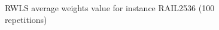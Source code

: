 \begin{figure}[H]
	\centering%
	\caption{RWLS average weights value for instance RAIL2536 (100 repetitions)}%
\end{figure}
